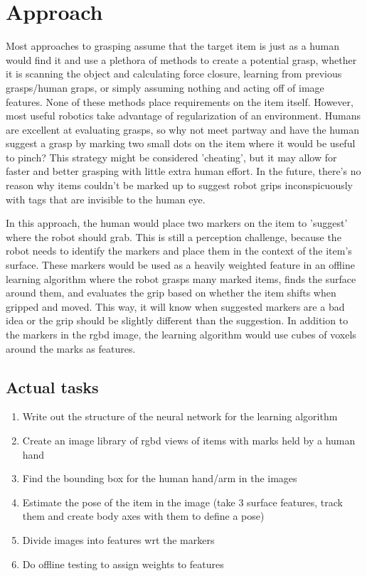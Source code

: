 \documentclass[10pt]{article}
\begin{document}
\section{Approach} \label{sec:approach}
Most approaches to grasping assume that the target item is just as a human would find it and use a plethora of methods to create a potential grasp, whether it is scanning the object and calculating force closure, learning from previous grasps/human graps, or simply assuming nothing and acting off of image features. None of these methods place requirements on the item itself. However, most useful robotics take advantage of regularization of an environment. Humans are excellent at evaluating grasps, so why not meet partway and have the human suggest a grasp by marking two small dots on the item where it would be useful to pinch? This strategy might be considered 'cheating', but it may allow for faster and better grasping with little extra human effort. In the future, there's no reason why items couldn't be marked up to suggest robot grips inconspicuously with tags that are invisible to the human eye. 

 In this approach, the human would place two markers on the item to 'suggest' where the robot should grab. This is still a perception challenge, because the robot needs to identify the markers and place them in the context of the item's surface. These markers would be used as a heavily weighted feature in an offline learning algorithm where the robot grasps many marked items, finds the surface around them, and evaluates the grip based on whether the item shifts when gripped and moved. This way, it will know when suggested markers are a bad idea or the grip should be slightly different than the suggestion. In addition to the markers in the rgbd image, the learning algorithm would use cubes of voxels around the marks as features.
 
 \subsection{Actual tasks}
 \begin{enumerate}
 \item Write out the structure of the neural network for the learning algorithm
 \item Create an image library of rgbd views of items with marks held by a human hand
 \item Find the bounding box for the human hand/arm in the images
 \item Estimate the pose of the item in the image (take 3 surface features, track them and create body axes with them to define a pose)
 \item Divide images into features wrt the markers
 \item Do offline testing to assign weights to features
\end{enumerate}  

 
 
\end{document}
